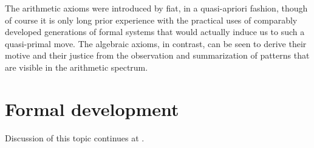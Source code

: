 \documentclass[12pt]{article}
\begin{document}
The arithmetic axioms were introduced by fiat, in a quasi-apriori fashion, though of course it is only long prior experience with the practical uses of comparably developed generations of formal systems that would actually induce us to such a quasi-primal move.  The algebraic axioms, in contrast, can be seen to derive their motive and their justice from the observation and summarization of patterns that are visible in the arithmetic spectrum.

\section{Formal development}

Discussion of this topic continues at .

\end{document}
